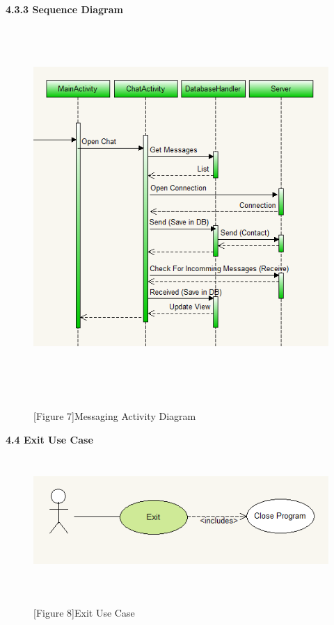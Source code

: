 \documentclass[29pt,a4paper]{moderncv}
\begin{document}
\newpage
		\textbf{4.3.3 Sequence Diagram}
			\begin{figure}
				\centering
				\\ \includegraphics[width=5.5in, height=5.0in]{./mesActivity.png}
				\\\caption{[Figure 7]Messaging Activity Diagram}\\
			\end{figure}	
		
\newpage		
	\left\textbf{4.4 Exit Use Case}
		\begin{figure}
			\centering
			\\ \includegraphics[width=6.0in, height=1.5in]{./exitCase.png}
			\\\caption{[Figure 8]Exit Use Case}\\
		\end{figure}
		
\end{document}
